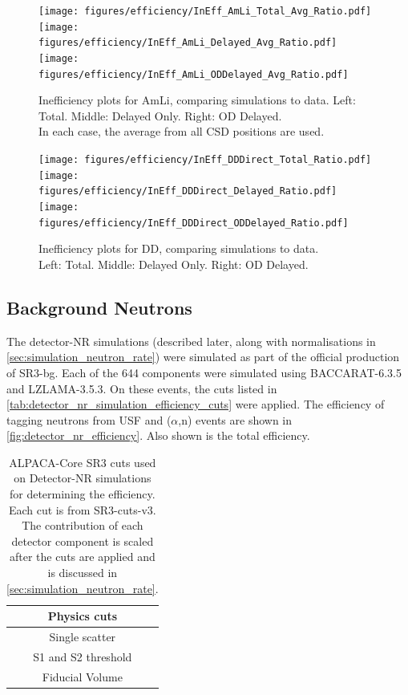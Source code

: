 \begin{figure}
\centering
\texttt{[image: figures/efficiency/InEff\_AmLi\_Total\_Avg\_Ratio.pdf]}\hfill
\texttt{[image: figures/efficiency/InEff\_AmLi\_Delayed\_Avg\_Ratio.pdf]}\hfill
\texttt{[image: figures/efficiency/InEff\_AmLi\_ODDelayed\_Avg\_Ratio.pdf]}
\caption{Inefficiency plots for AmLi, comparing simulations to data.
Left: Total. Middle: Delayed Only. Right: OD Delayed.\\
In each case, the average from all CSD positions are used.}
\label{fig:AmLiIneffPlots}
\end{figure}

\begin{figure}
\centering
\texttt{[image: figures/efficiency/InEff\_DDDirect\_Total\_Ratio.pdf]}\hfill
\texttt{[image: figures/efficiency/InEff\_DDDirect\_Delayed\_Ratio.pdf]}\hfill
\texttt{[image: figures/efficiency/InEff\_DDDirect\_ODDelayed\_Ratio.pdf]}
\caption{\centering Inefficiency plots for DD, comparing simulations to data.\\ Left: Total. Middle: Delayed Only. Right: OD Delayed.}
\label{fig:DDIneffPlots}
\end{figure}

\subsection{Background Neutrons}
The detector-NR simulations (described later, along with normalisations in \autoref{sec:simulation_neutron_rate}) were simulated as part of the official production of SR3-bg.
Each of the 644 components were simulated using BACCARAT-6.3.5 and LZLAMA-3.5.3.
On these events, the cuts listed in \autoref{tab:detector_nr_simulation_efficiency_cuts} were applied.
The efficiency of tagging neutrons from USF and ($\alpha$,n) events are shown in \autoref{fig:detector_nr_efficiency}.
Also shown is the total efficiency.

\begin{table}
    \centering
    \begin{tabular}{c}
     Physics cuts  \\
     \hline
     Single scatter \\
     S1 and S2 threshold \\
     Fiducial Volume 
    \end{tabular}
    \caption{ALPACA-Core SR3 cuts used on Detector-NR simulations for determining the efficiency.
    Each cut is from SR3-cuts-v3.
    The contribution of each detector component is scaled after the cuts are applied and is discussed in \autoref{sec:simulation_neutron_rate}.
    }
    \label{tab:detector_nr_simulation_efficiency_cuts}
\end{table}


